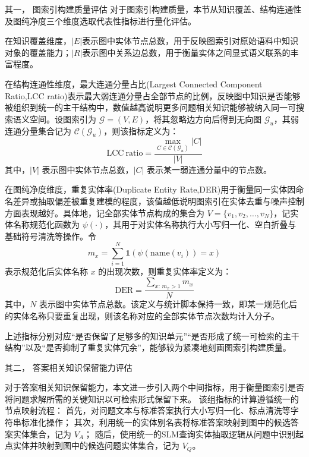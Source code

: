 \documentclass[promaster, vlined]{DissertUESTC}
\begin{document}
其一， 图索引构建质量评估
对于图索引构建质量，本节从知识覆盖、结构连通性及图纯净度三个维度选取代表性指标进行量化评估。

在知识覆盖维度，$|E|$表示图中实体节点总数，用于反映图索引对原始语料中知识对象的覆盖能力；$|R|$表示图中关系边总数，用于衡量实体之间显式语义联系的丰富程度。

在结构连通性维度，最大连通分量占比(Largest Connected Component Ratio,LCC ratio)表示最大弱连通分量占全部节点的比例，反映图中知识是否能够被组织到统一的主干结构中，数值越高说明更多问题相关知识能够被纳入同一可搜索语义空间。设图索引为 $\mathcal{G}=(V,E)$，将其忽略边方向后得到无向图 $\mathcal{G}_u$，其弱连通分量集合记为 $\mathcal{C}(\mathcal{G}_u)$，则该指标定义为：
\begin{equation}
\mathrm{LCC\ ratio}=\frac{\max_{C\in \mathcal{C}(\mathcal{G}_u)}|C|}{|V|}
\end{equation}
其中，$|V|$ 表示图中实体节点总数，$|C|$ 表示某一弱连通分量中的节点数。

在图纯净度维度，重复实体率(Duplicate Entity Rate,DER)用于衡量同一实体因命名差异或抽取偏差被重复建模的程度，该值越低说明图索引在实体去重与噪声控制方面表现越好。具体地，记全部实体节点构成的集合为 $V=\{v_1,v_2,\dots,v_N\}$，记实体名称规范化函数为 $\psi(\cdot)$，其用于对实体名称执行大小写归一化、空白折叠与基础符号清洗等操作。令
\begin{equation}
m_x=\sum_{i=1}^{N}\mathbf{1}\!\left(\psi(\mathrm{name}(v_i))=x\right)
\end{equation}
表示规范化后实体名称 $x$ 的出现次数，则重复实体率定义为：
\begin{equation}
\mathrm{DER}=\frac{\sum_{x:\, m_x>1} m_x}{N}
\end{equation}
其中，$N$ 表示图中实体节点总数。该定义与统计脚本保持一致，即某一规范化后的实体名称只要重复出现，则该名称对应的全部实体节点次数均计入分子。

上述指标分别对应“是否保留了足够多的知识单元”“是否形成了统一可检索的主干结构”以及“是否抑制了重复实体冗余”，能够较为紧凑地刻画图索引构建质量。

其二， 答案相关知识保留能力评估

对于答案相关知识保留能力，本文进一步引入两个中间指标，用于衡量图索引是否将问题求解所需的关键知识以可检索形式保留下来。
该组指标的计算遵循统一的节点映射流程：
首先，对问题文本与标准答案执行大小写归一化、标点清洗等字符串标准化操作；
其次，利用统一的实体别名表将标准答案映射到图中的候选答案实体集合，记为 $V_A$；
随后，使用统一的SLM查询实体抽取逻辑从问题中识别起点实体并映射到图中的候选问题实体集合，记为 $V_Q$。
\end{document}

